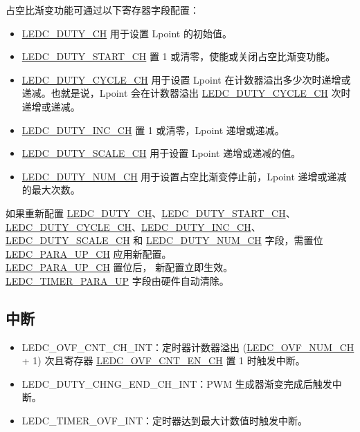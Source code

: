 \documentclass[main\_\_CN.tex]{subfiles}
\begin{document}
占空比渐变功能可通过以下寄存器字段配置：
\begin{itemize}
    \item \hyperref[fielddesc:LEDCDUTYCHN]{LEDC\_DUTY\_CH} 用于设置 Lpoint 的初始值。
    \item \hyperref[fielddesc:LEDCDUTYSTARTCHN]{LEDC\_DUTY\_START\_CH} 置 1 或清零，使能或关闭占空比渐变功能。
    \item \hyperref[fielddesc:LEDCDUTYCYCLECHN]{LEDC\_DUTY\_CYCLE\_CH} 用于设置 Lpoint 在计数器溢出多少次时递增或递减。也就是说，Lpoint 会在计数器溢出 \hyperref[fielddesc:LEDCDUTYCYCLECHN]{LEDC\_DUTY\_CYCLE\_CH} 次时递增或递减。
    \item \hyperref[fielddesc:LEDCDUTYINCCHN]{LEDC\_DUTY\_INC\_CH} 置 1 或清零，Lpoint 递增或递减。
    \item \hyperref[fielddesc:LEDCDUTYSCALECHN]{LEDC\_DUTY\_SCALE\_CH} 用于设置 Lpoint 递增或递减的值。
    \item \hyperref[fielddesc:LEDCDUTYNUMCHN]{LEDC\_DUTY\_NUM\_CH} 用于设置占空比渐变停止前，Lpoint 递增或递减的最大次数。
\end{itemize}

如果重新配置 \hyperref[fielddesc:LEDCDUTYCHN]{LEDC\_DUTY\_CH}、\hyperref[fielddesc:LEDCDUTYSTARTCHN]{LEDC\_DUTY\_START\_CH}、\hyperref[fielddesc:LEDCDUTYCYCLECHN]{LEDC\_DUTY\_CYCLE\_CH}、\hyperref[fielddesc:LEDCDUTYINCCHN]{LEDC\_DUTY\_INC\_CH}、\hyperref[fielddesc:LEDCDUTYSCALECHN]{LEDC\_DUTY\_SCALE\_CH} 和 \hyperref[fielddesc:LEDCDUTYNUMCHN]{LEDC\_DUTY\_NUM\_CH} 字段，需置位 \hyperref[fielddesc:LEDCPARAUPCHN]{LEDC\_PARA\_UP\_CH} 应用新配置。\\\hyperref[fielddesc:LEDCPARAUPCHN]{LEDC\_PARA\_UP\_CH} 置位后，
新配置立即生效。\hyperref[fielddesc:LEDCTIMERXPARAUP]{LEDC\_TIMER\_PARA\_UP} 字段由硬件自动清除。

\subsection{中断}
\begin{itemize}
\item \label{int:ledc-ovf-cnt}LEDC\_OVF\_CNT\_CH\_INT：定时器计数器溢出 (\hyperref[fielddesc:LEDCOVFNUMCHN]{LEDC\_OVF\_NUM\_CH} + 1) 次且寄存器 \hyperref[fielddesc:LEDCOVFCNTENCHN]{LEDC\_OVF\_CNT\_EN\_CH} 置 1 时触发中断。
\item \label{int:ledc-duty-chng-end}LEDC\_DUTY\_CHNG\_END\_CH\_INT：PWM 生成器渐变完成后触发中断。
\item \label{int:ledc-timer-ovf}LEDC\_TIMER\_OVF\_INT：定时器达到最大计数值时触发中断。
\end{itemize}
\end{document}
